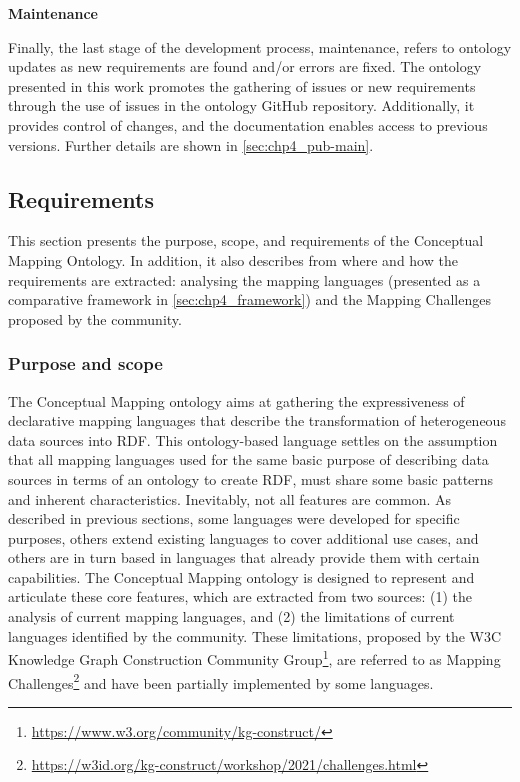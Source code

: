 \noindent\textbf{Maintenance}

Finally, the last stage of the development process, maintenance, refers to ontology updates as new requirements are found and/or errors are fixed. The ontology presented in this work promotes the gathering of issues or new requirements through the use of issues in the ontology GitHub repository. Additionally, it provides control of changes, and the documentation enables access to previous versions. Further details are shown in \cref{sec:chp4_pub-main}.



\subsection{Requirements}
\label{sec:chp4_requirements}
This section presents the purpose, scope, and requirements of the Conceptual Mapping Ontology. In addition, it also describes from where and how the requirements are extracted: analysing the mapping languages (presented as a comparative framework in \cref{sec:chp4_framework}) and the Mapping Challenges proposed by the community.

\subsubsection{Purpose and scope}

The Conceptual Mapping ontology aims at gathering the expressiveness of declarative mapping languages that describe the transformation of heterogeneous data sources into RDF. This ontology-based language settles on the assumption that all mapping languages used for the same basic purpose of describing data sources in terms of an ontology to create RDF, must share some basic patterns and inherent characteristics. Inevitably, not all features are common. As described in previous sections, some languages were developed for specific purposes, others extend existing languages to cover additional use cases, and others are in turn based in languages that already provide them with certain capabilities. The Conceptual Mapping ontology is designed to represent and articulate these core features, which are extracted from two sources: (1) the analysis of current mapping languages, and (2) the limitations of current languages identified by the community. These limitations, proposed by the W3C Knowledge Graph Construction Community Group\footnote{\label{foot:kgc}\url{https://www.w3.org/community/kg-construct/}}, are referred to as Mapping Challenges\footnote{\label{foot:challenges}\url{https://w3id.org/kg-construct/workshop/2021/challenges.html}} and have been partially implemented by some languages. %

